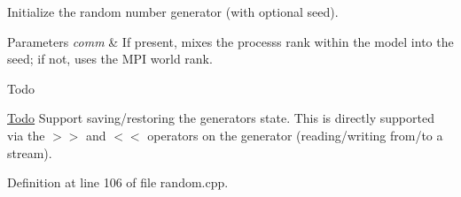 Initialize the random number generator (with optional seed). 
\begin{DoxyParams}{Parameters}
{\em comm} & If present, mixes the process\textquotesingle{}s rank within the model into the seed; if not, uses the M\+PI world rank. \\
\hline
\end{DoxyParams}
\begin{DoxyRefDesc}{Todo}
\item[\hyperlink{todo__todo000030}{Todo}]Support saving/restoring the generator\textquotesingle{}s state. This is directly supported via the $>$$>$ and $<$$<$ operators on the generator (reading/writing from/to a stream). \end{DoxyRefDesc}


Definition at line 106 of file random.\+cpp.


